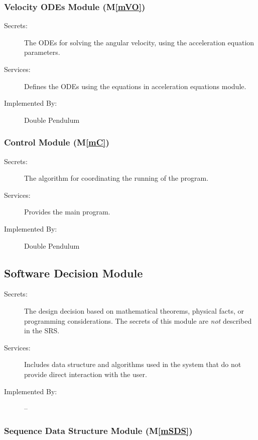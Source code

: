 \documentclass[12pt, titlepage]{article}
\newcommand{\mref}[1]{M\ref{#1}}
\begin{document}
\subsubsection{Velocity ODEs Module (\mref{mVO})}

\begin{description}
\item[Secrets:]The ODEs for solving the angular velocity, using the acceleration
  equation parameters.
\item[Services:]Defines the ODEs using the equations in acceleration equations
  module.
\item[Implemented By:] Double Pendulum
\end{description}

\subsubsection{Control Module (\mref{mC})}

\begin{description}
\item[Secrets:]The algorithm for coordinating the running of the program.
\item[Services:]Provides the main program.
\item[Implemented By:] Double Pendulum
\end{description} 


\subsection{Software Decision Module}

\begin{description}
\item[Secrets:] The design decision based on mathematical theorems, physical
  facts, or programming considerations. The secrets of this module are
  \emph{not} described in the SRS.
\item[Services:] Includes data structure and algorithms used in the system that
  do not provide direct interaction with the user. 
\item[Implemented By:] --
\end{description}

\subsubsection{Sequence Data Structure Module (\mref{mSDS})}
\end{document}
